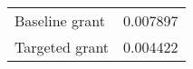  \begin{tabular}{lc} \hline \hline 
Baseline grant        & 0.007897 \\ 
Targeted grant         & 0.004422 \\ 
\hline \hline 
 \end{tabular} 
